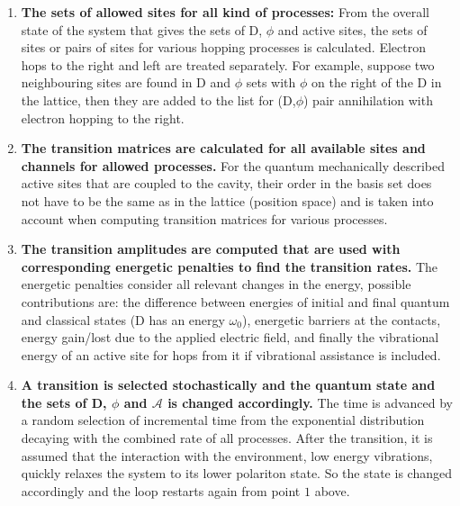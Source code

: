 \documentclass[a4paper,twocolumn]{revtex4-1} %
\begin{document}
\begin{enumerate}
\item 
{\bf The sets of allowed sites for all kind of processes:}
From the overall state of the system
that gives
the sets of D, $\phi$ and active sites, 
the sets of sites or pairs of sites for various hopping processes
is calculated. Electron hops to the right and left are treated separately.
For example, suppose two neighbouring sites are found in D and $\phi$ sets
with $\phi$ on the right of the D in the lattice, 
then they are added to the list for (D,$\phi$) pair annihilation with electron hopping to the right.


\item
{\bf The transition matrices are calculated for all available sites and channels for allowed processes.}
For the quantum mechanically described active sites that are coupled to the cavity,
their order in the basis set does not have to be the same as in the lattice (position space)
and is taken into account when computing transition matrices for various processes.

\item
{\bf  The transition amplitudes are computed that are used with corresponding energetic penalties 
to find the transition rates.}
The energetic penalties consider all relevant changes in the energy, possible contributions are:
the difference between energies of initial and final quantum
and classical states (D has an energy $\omega_0$),
energetic barriers at the contacts, energy gain/lost due to the applied electric field,
and finally the vibrational energy of an active site for hops from it if vibrational assistance is included.

\item 
{\bf  A transition is selected stochastically and the quantum state and the sets of D, $\phi$ and $\mathcal{A}$ is changed accordingly.}
The time is advanced by a random selection of incremental time
from the exponential distribution decaying with the combined rate of all processes. 
After the transition, it is assumed that the interaction with the environment, low energy vibrations,
quickly relaxes the system to its lower polariton state.
So the state is changed accordingly and the loop restarts again from point $1$ above.

\end{enumerate}
\end{document}
